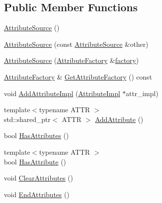 \subsection*{Public Member Functions}
\begin{DoxyCompactItemize}
\item 
\mbox{\hyperlink{classlucene_1_1core_1_1util_1_1AttributeSource_aef30fddd7e976cf96938778e73ebba1f}{Attribute\+Source}} ()
\item 
\mbox{\hyperlink{classlucene_1_1core_1_1util_1_1AttributeSource_a46285603ecad877610be674c124fd632}{Attribute\+Source}} (const \mbox{\hyperlink{classlucene_1_1core_1_1util_1_1AttributeSource}{Attribute\+Source}} \&other)
\item 
\mbox{\hyperlink{classlucene_1_1core_1_1util_1_1AttributeSource_a3111b8c073c694240c1797420c7031a3}{Attribute\+Source}} (\mbox{\hyperlink{classlucene_1_1core_1_1util_1_1AttributeFactory}{Attribute\+Factory}} \&\mbox{\hyperlink{classlucene_1_1core_1_1util_1_1AttributeSource_a1376420a752f337a0fdb582bdf160eba}{factory}})
\item 
\mbox{\hyperlink{classlucene_1_1core_1_1util_1_1AttributeFactory}{Attribute\+Factory}} \& \mbox{\hyperlink{classlucene_1_1core_1_1util_1_1AttributeSource_ab361967a0235e8d9f1afab451d5d2e99}{Get\+Attribute\+Factory}} () const
\item 
void \mbox{\hyperlink{classlucene_1_1core_1_1util_1_1AttributeSource_a5aeee12f7ccd43874a1bc2447f3e54ac}{Add\+Attribute\+Impl}} (\mbox{\hyperlink{classlucene_1_1core_1_1util_1_1AttributeImpl}{Attribute\+Impl}} $\ast$attr\+\_\+impl)
\item 
{\footnotesize template$<$typename A\+T\+TR $>$ }\\std\+::shared\+\_\+ptr$<$ A\+T\+TR $>$ \mbox{\hyperlink{classlucene_1_1core_1_1util_1_1AttributeSource_af07d54141811dd0711441530dffc5e8f}{Add\+Attribute}} ()
\item 
bool \mbox{\hyperlink{classlucene_1_1core_1_1util_1_1AttributeSource_a885ff0d539fc9d2763412c18f5c19097}{Has\+Attributes}} ()
\item 
{\footnotesize template$<$typename A\+T\+TR $>$ }\\bool \mbox{\hyperlink{classlucene_1_1core_1_1util_1_1AttributeSource_a214d5ca7edcf7bed74db8d73c73f9802}{Has\+Attribute}} ()
\item 
void \mbox{\hyperlink{classlucene_1_1core_1_1util_1_1AttributeSource_a7c2b117da3dac9f29017a5bb5562d6de}{Clear\+Attributes}} ()
\item 
void \mbox{\hyperlink{classlucene_1_1core_1_1util_1_1AttributeSource_a52fad6b087a947622e3f4485357f78b2}{End\+Attributes}} ()

\end{DoxyCompactItemize}
